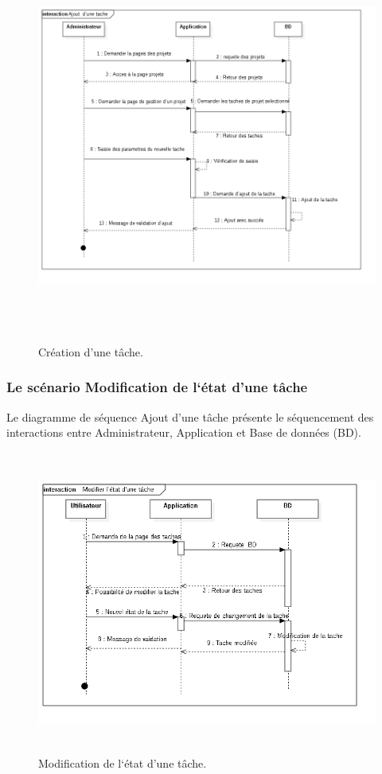 \begin{figure}[H]
\center
\includegraphics[width=14cm,height=13cm]{./figures/seq/C.png}
\caption{Cr\'{e}ation d'une t\^{a}che.}
\end{figure}


\newpage
\subsubsection{ Le sc\'{e}nario \guillemotleft{} Modification de l`\'{e}tat d'une t\^{a}che\guillemotright{}}

Le diagramme de s\'{e}quence \guillemotleft{} Ajout d'une t\^{a}che \guillemotright{} pr\'{e}sente le s\'{e}quencement
des interactions entre Administrateur, Application et Base de donn\'{e}es (BD).


\begin{figure}[H]
\center
\includegraphics[width=14cm,height=10cm]{./figures/seq/D.png}
\caption{ Modification de l`\'{e}tat d'une t\^{a}che.}
\end{figure}


